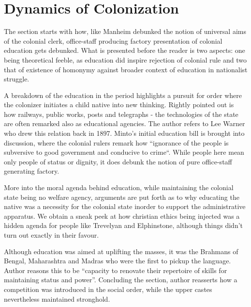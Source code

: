 \documentclass[a4paper]{article}
\begin{document}
\section{Dynamics of Colonization}
    
    The section starts with how, like Manheim debunked
    the notion of universal aims of the colonial clerk,
    office-staff producing factory presentation of
    colonial education gets debunked. What is presented
    before the reader is two aspects: one being
    theoretical feeble, as education did inspire
    rejection of colonial rule and two that of existence
    of homonymy against broader context of education in
    nationalist struggle.

    A breakdown of the education in the period
    highlights a pursuit for order where the colonizer
    initiates a child native into new thinking. Rightly
    pointed out is how railways, public works, posts and
    telegraphs - the technologies of the state are often
    remarked also as educational agencies. The author
    refers to Lee Warner who drew this relation back in
    1897. Minto's initial education bill is brought into
    discussion, where the colonial rulers remark how
    ``ignorance of the people is subversive to good
    government and conducive to crime``. While people
    here mean only people of status or dignity, it does
    debunk the notion of pure office-staff generating
    factory. 

    More into the moral agenda behind education, while
    maintaining the colonial state being no welfare
    agency, arguments are put forth as to why educating
    the native was a necessity for the colonial state
    inorder to support the administrative apparatus. We
    obtain a sneak peek at how christian ethics being
    injected was a hidden agenda for people like
    Trevelyan and Elphinstone, although things didn't
    turn out exactly in their favour.

    Although education was aimed at uplifting the
    masses, it was the Brahmans of Bengal, Maharashtra
    and Madras who were the first to pickup the
    language. Author reasons this to be ``capacity to
    renovate their repertoire of skills for maintaining
    status and power''. Concluding the section, author 
    reasserts how a competition was introduced in the
    social order, while the upper castes nevertheless
    maintained stronghold. 

\end{document}
